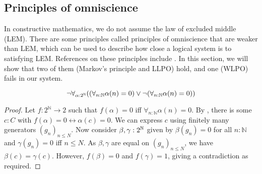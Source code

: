 \subsection{Principles of omniscience}
In constructive mathematics, we do not assume the law of excluded middle (LEM).
There are some principles called principles of omniscience that are weaker than LEM, which can be used to describe 
how close a logical system is to satisfying LEM.
References on these principles include \cite{HannesDiener, ReverseMathsBishop}.
In this section, we will show that two of them (Markov's principle and LLPO) hold, 
and one (WLPO) fails in our system.

\begin{theorem}\label{NotWLPO}
  \begin{equation}
    \neg \forall_{\alpha:2^{\mathbb{N}}} 
    ((\forall_{n:\mathbb{N}} \alpha(n) = 0 ) \vee \neg (\forall_{n:\mathbb{N}} \alpha(n) = 0))
  \end{equation}
\end{theorem}
\begin{proof}
  Let $f:2^\mathbb N \to 2$ such that 
  $f(\alpha) = 0$ iff $\forall_{n:\mathbb N} \alpha (n)= 0$. 
  By , there is some $c:C$ with 
  $f(\alpha) = 0 \leftrightarrow \alpha(c) = 0$. 
  We can express $c$ using finitely many generators $(g_n)_{n\leq N}$. 
  Now consider $\beta,\gamma:2^{\mathbb{N}}$ given by 
  $\beta(g_n) = 0$ for all $n:\mathbb N$ and
  $\gamma(g_n) = 0$ iff $n\leq N$. 
  As $\beta, \gamma$ are equal on $(g_n)_{n\leq N}$, we have $\beta(c) = \gamma(c)$. 
  However, $f(\beta) = 0$ and $f(\gamma) = 1$, giving a contradiction as required. 
\end{proof}

